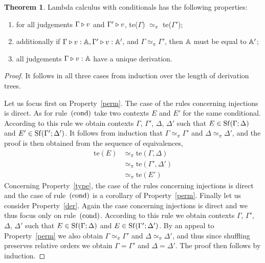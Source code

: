 \documentclass[10pt,a4paper]{amsart}
\theoremstyle{definition}
\theoremstyle{definition}
\theoremstyle{definition}
\theoremstyle{definition}
\theoremstyle{definition}
\theoremstyle{definition}
\newtheorem{theorem}[definition]{Theorem}
\begin{document}
\begin{theorem} \label {theorem:unique_der}
   Lambda calculus with conditionals has the following properties:
   \begin{enumerate}
     \item\label{perm} for all judgements $\Gamma \triangleright v$ and $\Gamma'
             \triangleright v$, te($\Gamma$) $\simeq_{\pi}$  te($\Gamma'$); 
     \item\label{type} additionally if $\Gamma \triangleright v: \mathbb{A},
       \Gamma' \triangleright v: \mathbb{A}'$, and $\Gamma \simeq_{\pi}
       \Gamma'$, then $\mathbb{A}$ must be equal to $\mathbb{A}'$;
     \item\label{der} all judgements $\Gamma \triangleright v:\mathbb{A}$ have a unique derivation.
\end{enumerate}
\end{theorem}
%
\begin{proof}
It follows in all three cases from induction over the length of derivation
trees. 

Let us focus first on Property~\eqref{perm}. The case of the rules concerning
injections is direct. As for rule~$(\mathrm{cond})$ take two contexts $E$ and
$E'$ for the same conditional. According to this rule we obtain contexts
$\Gamma$, $\Gamma'$, $\Delta$, $\Delta'$ such that $E \in
\mathrm{Sf}(\Gamma;\Delta)$ and $E' \in \mathrm{Sf}(\Gamma';\Delta')$. It follows from
induction that  $\Gamma \simeq_\pi \Gamma'$ and $\Delta \simeq_\pi \Delta'$,
and the proof is then obtained from the sequence of equivalences,
\begin{align*}
        \text{te}(E) & \simeq_\pi \text{te}(\Gamma, \Delta) 
        \\
        & \simeq_\pi \text{te}(\Gamma', \Delta')
        \\
        & \simeq_\pi \text{te}(E')
\end{align*}
Concerning Property~\eqref{type}, the case of the rules concerning injections
is direct and the case of rule~$(\mathrm{cond})$ is a corollary of
Property~\eqref{perm}. Finally let us consider Property~\eqref{der}. Again the
case concerning injections is direct and we thus focus only on
rule~$(\mathrm{cond})$. According to this rule we obtain contexts $\Gamma$,
$\Gamma'$, $\Delta$, $\Delta'$ such that $E \in \mathrm{Sf}(\Gamma;\Delta)$ and $E
\in \mathrm{Sf}(\Gamma';\Delta')$. By an appeal to Property~\eqref{perm} we also
obtain $\Gamma \simeq_\pi \Gamma'$ and $\Delta \simeq_\pi \Delta'$, and thus
since shuffling preserves relative orders we obtain $\Gamma = \Gamma'$ and
$\Delta = \Delta'$. The proof then follows by induction.
\end{proof}
\end{document}
